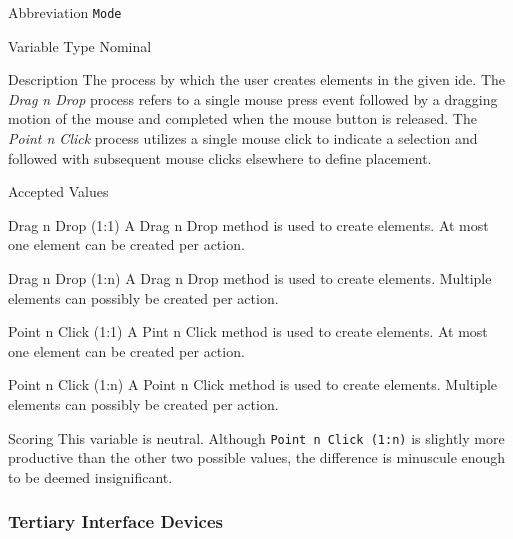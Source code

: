 \begin{AlignedDesc}
  \item[Abbreviation] \texttt{Mode}

  \item[Variable Type] Nominal

  \item[Description] The process by which the user creates elements in the
  given \ac{ide}. The \textit{Drag n Drop} process refers to a single
  mouse press event followed by a dragging motion of the mouse and
  completed when the mouse button is released. The \textit{Point n Click}
  process utilizes a single mouse click to indicate a selection and
  followed with subsequent mouse clicks elsewhere to define placement.

  \item[Accepted Values]

  \begin{AlignedDesc}
    \item[Drag n Drop (1:1)] A Drag n Drop method is used to create
    elements. At most one element can be created per action.
    \item[Drag n Drop (1:n)] A Drag n Drop method is used to create
    elements. Multiple elements can possibly be created per action.
    \item[Point n Click (1:1)] A Pint n Click method is used to create
    elements. At most one element can be created per action.
    \item[Point n Click (1:n)] A Point n Click method is used to create
    elements. Multiple elements can possibly be created per action.
  \end{AlignedDesc}

  \item[Scoring] This variable is neutral. Although \texttt{Point n Click
  (1:n)} is slightly more productive than the other two possible values,
  the difference is minuscule enough to be deemed insignificant.

\end{AlignedDesc}

\subsubsection{Tertiary Interface Devices}
\label{subsubsec:devices}


